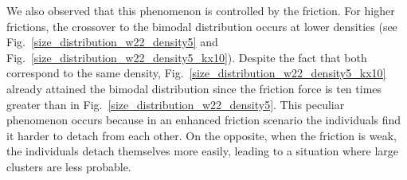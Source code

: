 \documentclass[preprint,12pt]{elsarticle}
\begin{document}
We also observed that this phenomenon is controlled by the friction. For higher frictions, the crossover to the bimodal distribution occurs at lower densities (see Fig.~\ref{size_distribution_w22_density5} and Fig.~\ref{size_distribution_w22_density5_kx10}). Despite the fact that both correspond to the same density, Fig.~\ref{size_distribution_w22_density5_kx10} already attained the bimodal distribution since the friction force is ten times greater than in Fig.~\ref{size_distribution_w22_density5}. This peculiar phenomenon
occurs because in an enhanced friction scenario the
individuals find it harder to detach from each other. On
the opposite, when the friction is weak, the individuals
detach themselves more easily, leading to a situation
where large clusters are less probable.\\
\end{document}
